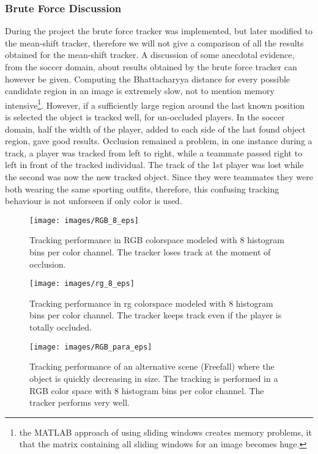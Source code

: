 \documentclass[a4paper,11pt]{article}
\begin{document}
 

\subsubsection{Brute Force Discussion} 
During the project the brute force tracker was implemented, but later modified to the mean-shift tracker, therefore we will not give a comparison of all the results obtained for the mean-shift tracker. A discussion of some anecdotal evidence, from the soccer domain, about results obtained by the brute force tracker can however be given. Computing the Bhattacharyya distance for every possible candidate region in an image is extremely slow, not to mention memory intensive\footnote{the MATLAB approach of using sliding windows creates memory problems, it that the matrix containing all sliding windows for an image becomes huge.}. However, if a sufficiently large region around the last known position is selected the object is tracked well, for un-occluded players. In the soccer domain, half the width of the player, added to each side of the last found object region, gave good results. Occlusion remained a problem, in one instance during a track, a player was tracked from left to right, while a teammate passed right to left in front of the tracked individual. The track of the 1st player was lost while the second was now the new tracked object. Since they were teammates they were both wearing the same sporting outfits, therefore, this confusing tracking behaviour is not unforseen if only color is used.

\begin{figure}[!ht]
\label{fig:RGB_8}
\centering
\texttt{[image: images/RGB\_8\_eps]}
\caption{Tracking performance in RGB colorspace modeled with 8 histogram bins per color channel.
The tracker loses track at the moment of occlusion.}
\label{fig:rg}
\end{figure}

\begin{figure}[!ht]
\label{fig:rg_8}
\centering
\texttt{[image: images/rg\_8\_eps]}
\caption{Tracking performance in rg colorspace modeled with 8 histogram bins per color channel.
The tracker keeps track even if the player is totally occluded.}
\end{figure}

\begin{figure}[!ht]
\label{fig:para}
\centering
\texttt{[image: images/RGB\_para\_eps]}
\caption{Tracking performance of an alternative scene (Freefall)
where the object is quickly decreasing in size. The tracking is performed in a
RGB color space with 8 histogram bins per color channel. The tracker performs very well.}
\end{figure}
\end{document}
